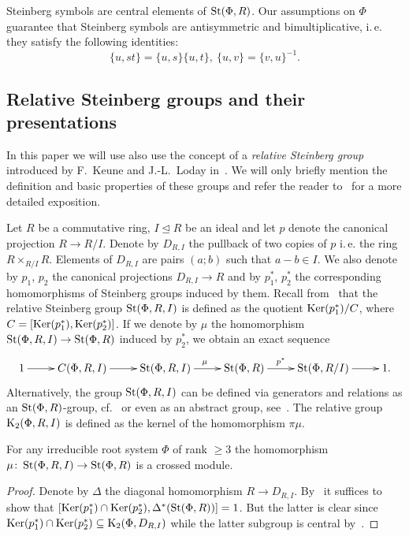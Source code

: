 Steinberg symbols are central elements of $\operatorname{St}(\Phi, R)$.
Our assumptions on $\Phi$ guarantee that Steinberg symbols are antisymmetric and bimultiplicative, i.\,e. they satisfy the following identities:
\begin{equation} \label{eq:symbol-properties} \{ u, st \} = \{ u, s\} \{ u, t \}, \ \{ u, v \} = \{ v, u\}^{-1}. \end{equation}


\subsection{Relative Steinberg groups and their presentations} \label{subsec:another-presentation}
In this paper we will use also use the concept of a \textit{relative Steinberg group} introduced by F.~Keune and J.-L.~Loday in~\cite{Ke78, Lo78}.
We will only briefly mention the definition and basic properties of these groups and refer the reader to~\cite[\S~2.3]{LS20} for a more detailed exposition.

Let $R$ be a commutative ring, $I \trianglelefteq R$ be an ideal and let $p$ denote the canonical projection $R \to R/I$.
Denote by $D_{R, I}$ the pullback of two copies of $p$ i.\,e. the ring $R \times_{R/I} R$.
Elements of $D_{R, I}$ are pairs $(a; b)$ such that $a-b \in I$.
We also denote by $p_1$, $p_2$ the canonical projections $D_{R, I} \to R$ and by $p_1^*$, $p_2^*$ the corresponding homomorphisms of Steinberg groups induced by them.
Recall from~\cite[Definition~2.5]{LS20} that the relative Steinberg group $\operatorname{St}(\Phi, R, I)$ is defined as the quotient
$\operatorname{Ker}(p_1^*) / C$, where $C = [\operatorname{Ker}(p_1^*), \operatorname{Ker}(p_2^*)]$.
If we denote by $\mu$ the homomorphism $\operatorname{St}(\Phi, R, I) \to \operatorname{St}(\Phi, R)$ induced by $p_2^*$, we obtain an exact sequence
\begin{equation}
    \xymatrix{1 \ar[r] & C(\Phi, R, I) \ar[r] & \St(\Phi, R, I) \ar[r]^\mu & \St(\Phi, R) \ar[r]^-{p^*} & \St(\Phi, R/I) \ar[r] & 1. }\label{eq:relative-Steinberg}
\end{equation}
Alternatively, the group $\operatorname{St}(\Phi, R, I)$ can be defined via generators and relations as an $\operatorname{St}(\Phi, R)$-group, cf.~\cite[Proposition~6]{S15}
or even as an abstract group, see~\cite{V22}.
The relative group $\operatorname{K}_2(\Phi, R, I)$ is defined as the kernel of the homomorphism $\pi \mu$.

\begin{lemma} \label{lem:rel-Steinberg-crossed-module}
For any irreducible root system $\Phi$ of rank $\geq 3$ the homomorphism $\mu \colon \operatorname{St}(\Phi, R, I) \to \operatorname{St}(\Phi, R)$ is a crossed module.
\end{lemma}
\begin{proof}
    Denote by $\Delta$ the diagonal homomorphism $R \to D_{R, I}.$
    By~\cite[Proposition~6]{Lo78} it suffices to show that $[\operatorname{Ker}(p_1^*) \cap \operatorname{Ker}(p_2^*), \Delta^*(\operatorname{St}(\Phi, R))] = 1$.
    But the latter is clear since $\operatorname{Ker}(p_1^*) \cap \operatorname{Ker}(p_2^*) \subseteq \operatorname{K}_2(\Phi, D_{R, I})$ while the latter subgroup is central by~\cite{LSV1}.
\end{proof}

